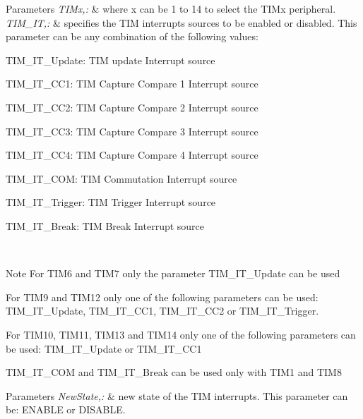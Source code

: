 \begin{DoxyParams}{Parameters}
{\em T\-I\-Mx,\-:} & where x can be 1 to 14 to select the T\-I\-Mx peripheral. \\
\hline
{\em T\-I\-M\-\_\-\-I\-T,\-:} & specifies the T\-I\-M interrupts sources to be enabled or disabled. This parameter can be any combination of the following values\-: \begin{DoxyItemize}
\item T\-I\-M\-\_\-\-I\-T\-\_\-\-Update\-: T\-I\-M update Interrupt source \item T\-I\-M\-\_\-\-I\-T\-\_\-\-C\-C1\-: T\-I\-M Capture Compare 1 Interrupt source \item T\-I\-M\-\_\-\-I\-T\-\_\-\-C\-C2\-: T\-I\-M Capture Compare 2 Interrupt source \item T\-I\-M\-\_\-\-I\-T\-\_\-\-C\-C3\-: T\-I\-M Capture Compare 3 Interrupt source \item T\-I\-M\-\_\-\-I\-T\-\_\-\-C\-C4\-: T\-I\-M Capture Compare 4 Interrupt source \item T\-I\-M\-\_\-\-I\-T\-\_\-\-C\-O\-M\-: T\-I\-M Commutation Interrupt source \item T\-I\-M\-\_\-\-I\-T\-\_\-\-Trigger\-: T\-I\-M Trigger Interrupt source \item T\-I\-M\-\_\-\-I\-T\-\_\-\-Break\-: T\-I\-M Break Interrupt source\end{DoxyItemize}
\\
\hline
\end{DoxyParams}
\begin{DoxyNote}{Note}
For T\-I\-M6 and T\-I\-M7 only the parameter T\-I\-M\-\_\-\-I\-T\-\_\-\-Update can be used 

For T\-I\-M9 and T\-I\-M12 only one of the following parameters can be used\-: T\-I\-M\-\_\-\-I\-T\-\_\-\-Update, T\-I\-M\-\_\-\-I\-T\-\_\-\-C\-C1, T\-I\-M\-\_\-\-I\-T\-\_\-\-C\-C2 or T\-I\-M\-\_\-\-I\-T\-\_\-\-Trigger. 

For T\-I\-M10, T\-I\-M11, T\-I\-M13 and T\-I\-M14 only one of the following parameters can be used\-: T\-I\-M\-\_\-\-I\-T\-\_\-\-Update or T\-I\-M\-\_\-\-I\-T\-\_\-\-C\-C1 

T\-I\-M\-\_\-\-I\-T\-\_\-\-C\-O\-M and T\-I\-M\-\_\-\-I\-T\-\_\-\-Break can be used only with T\-I\-M1 and T\-I\-M8
\end{DoxyNote}

\begin{DoxyParams}{Parameters}
{\em New\-State,\-:} & new state of the T\-I\-M interrupts. This parameter can be\-: E\-N\-A\-B\-L\-E or D\-I\-S\-A\-B\-L\-E. \\
\hline
\end{DoxyParams}

